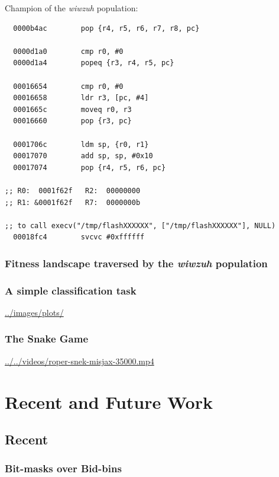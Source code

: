 \documentclass[11pt]{article}
\begin{document}
Champion of the \emph{wiwzuh} population:
\lstset{language=asm,label= ,caption= ,captionpos=b,numbers=none}
\begin{lstlisting}
  0000b4ac        pop {r4, r5, r6, r7, r8, pc}

  0000d1a0        cmp r0, #0
  0000d1a4        popeq {r3, r4, r5, pc}

  00016654        cmp r0, #0
  00016658        ldr r3, [pc, #4]
  0001665c        moveq r0, r3
  00016660        pop {r3, pc}

  0001706c        ldm sp, {r0, r1}
  00017070        add sp, sp, #0x10
  00017074        pop {r4, r5, r6, pc}

;; R0:  0001f62f   R2:  00000000
;; R1: &0001f62f   R7:  0000000b

;; to call execv("/tmp/flashXXXXXX", ["/tmp/flashXXXXXX"], NULL) 
  00018fc4        svcvc #0xffffff
\end{lstlisting}


\subsubsection*{Fitness landscape traversed by the \emph{wiwzuh} population}
\label{sec:org30ad8fa}



\subsubsection*{A simple classification task}
\label{sec:org8428642}

\url{../images/plots/}

\subsubsection*{The Snake Game}
\label{sec:orgc32b1b6}

\url{../../videos/roper-snek-misjax-35000.mp4}

\section*{Recent and Future Work}
\label{sec:org56f2630}

\subsection*{Recent}
\label{sec:orgdc18fc9}

\subsubsection*{Bit-masks over Bid-bins}
\label{sec:org8ed8c63}
\end{document}
